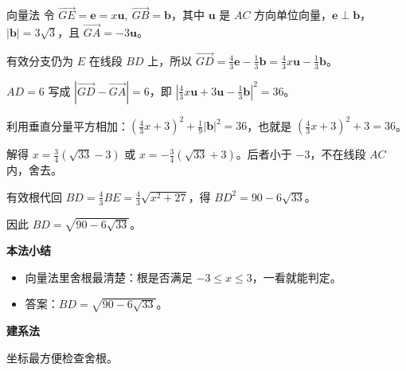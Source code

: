 \documentclass{exam-zh}
\newenvironment{eduSubQuestionItem}[1]{%
  \needspace{4\baselineskip}%
  \vspace{2mm}
  \par\noindent
  \hangindent=8mm\hangafter=1
  {\color{edu-blue}\bfseries #1}\enspace
  \begingroup
  \color{edu-ink}
}{%
  \endgroup
  \par
  \vspace{3mm}
}
\newenvironment{eduBulletList}{%
  \begin{itemize}[
    label=\textbullet,
    leftmargin=5mm,
    itemsep=1.2mm,
    topsep=0pt,
    parsep=0pt
  ]
}{%
  \end{itemize}
}
\begin{document}
\begin{eduSolutionBox}{向量法}
  \begingroup
  \setlength{\parskip}{2.5mm}
令 $\vec{GE}=\mathbf e=x\mathbf u,\ \vec{GB}=\mathbf b$，其中 $\mathbf u$ 是 $AC$ 方向单位向量，$\mathbf e\perp\mathbf b$，$|\mathbf b|=3\sqrt3$，且 $\vec{GA}=-3\mathbf u$。\par
有效分支仍为 $E$ 在线段 $BD$ 上，所以 $\vec{GD}=\frac43\mathbf e-\frac13\mathbf b=\frac43x\mathbf u-\frac13\mathbf b$。\par
$AD=6$ 写成 $|\vec{GD}-\vec{GA}|=6$，即 $|\frac43x\mathbf u+3\mathbf u-\frac13\mathbf b|^2=36$。\par
利用垂直分量平方相加：$(\frac43x+3)^2+\frac19|\mathbf b|^2=36$，也就是 $(\frac43x+3)^2+3=36$。\par
解得 $x=\frac34(\sqrt{33}-3)$ 或 $x=-\frac34(\sqrt{33}+3)$。后者小于 $-3$，不在线段 $AC$ 内，舍去。\par
有效根代回 $BD=\frac43BE=\frac43\sqrt{x^2+27}$，得 $BD^2=90-6\sqrt{33}$。\par
因此 $BD=\sqrt{90-6\sqrt{33}}$。\par
  \endgroup
  \vspace{2.5mm}
  {\color{edu-blue}\bfseries\small 本法小结}\par\vspace{1.5mm}
  \begin{eduBulletList}
    \item 向量法里舍根最清楚：根是否满足 $-3\le x\le3$，一看就能判定。    \item 答案：$BD=\sqrt{90-6\sqrt{33}}$。  \end{eduBulletList}
\end{eduSolutionBox}




\begin{eduSubQuestionItem}{建系法}
坐标最方便检查舍根。\end{eduSubQuestionItem}
\end{document}
